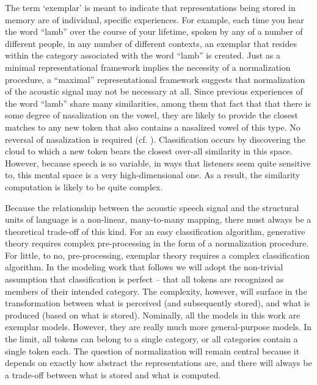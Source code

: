 The term `exemplar' is meant to indicate that representations being
stored in memory are of individual, specific experiences. For example,
each time you hear the word “lamb” over the course of your lifetime,
spoken by any of a number of different people, in any number of different
contexts, an exemplar that resides within the category associated
with the word “lamb” is created. Just as a minimal representational
framework implies the necessity of a normalization procedure, a “maximal”
representational framework suggests that normalization of the acoustic
signal may not be necessary at all. Since previous experiences of
the word “lamb” share many similarities, among them that fact
that that there is some degree of nasalization on the vowel, they
are likely to provide the closest matches to any new token that also
contains a nasalized vowel of this type. No reversal of nasalization
is required (cf. \citealt{Johnson1997a}). Classification occurs by
discovering the cloud to which a new token bears the closest over-all
similarity in this space. However, because speech is so variable,
in ways that listeners seem quite sensitive to, this mental space
is a very high-dimensional one. As a result, the similarity computation
is likely to be quite complex. 

Because the relationship between the acoustic speech signal and the
structural units of language is a non-linear, many-to-many mapping,
there must always be a theoretical trade-off of this kind. For an
easy classification algorithm, generative theory requires complex
pre-processing in the form of a normalization procedure. For little,
to no, pre-processing, exemplar theory requires a complex classification
algorithm. In the modeling work that follows we will adopt the non-trivial
assumption that classification is perfect – that all tokens are recognized
as members of their intended category. The complexity, however, will
surface in the transformation between what is perceived (and subsequently
stored), and what is produced (based on what is stored). Nominally,
all the models in this work are exemplar models. However, they are
really much more general-purpose models. In the limit, all tokens
can belong to a single category, or all categories contain a single
token each. The question of normalization will remain central because
it depends on exactly how abstract the representations are, and there
will always be a trade-off between what is stored and what is computed. 